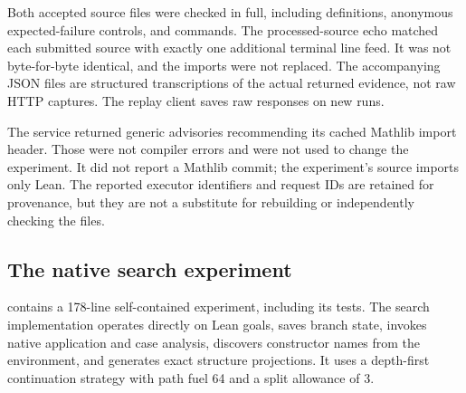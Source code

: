 Both accepted source files were checked in full, including definitions, anonymous expected-failure controls, and  commands. The processed-source echo matched each submitted source with exactly one additional terminal line feed. It was not byte-for-byte identical, and the imports were not replaced. The accompanying JSON files are structured transcriptions of the actual returned evidence, not raw HTTP captures. The replay client saves raw responses on new runs.

The service returned generic advisories recommending its cached Mathlib import header. Those were not compiler errors and were not used to change the experiment. It did not report a Mathlib commit; the experiment's source imports only Lean. The reported executor identifiers and request IDs are retained for provenance, but they are not a substitute for rebuilding or independently checking the files.

\subsection{The native search experiment}
 contains a 178-line self-contained experiment, including its tests. The search implementation operates directly on Lean goals, saves branch state, invokes native application and case analysis, discovers constructor names from the environment, and generates exact structure projections. It uses a depth-first continuation strategy with path fuel 64 and a split allowance of 3.

